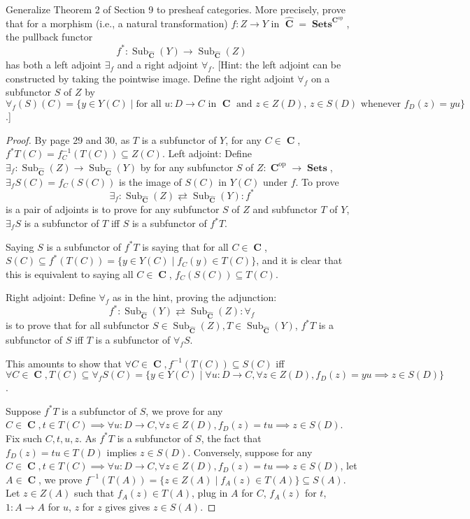 \documentclass[a4paper]{article}
\DeclareMathOperator{\Sets}{\mathbf {Sets}}
\DeclareMathOperator{\C}{\mathbf {C}}
\DeclareMathOperator{\op}{op}
\DeclareMathOperator{\Sub}{\text {Sub}}
\begin{document}
\begin{question}
    Generalize Theorem 2 of Section 9 to presheaf categories. More precisely, prove that for a morphism (i.e., a natural transformation) $f: Z\to Y$ in $\widehat{\C}=\Sets^{\C^{\op}}$, the pullback functor 
    \[f^*: \Sub_{\widehat{\C}}(Y)\to \Sub_{\widehat{\C}}(Z)\]
    has both a left adjoint $\exists_f$ and a right adjoint $\forall_f$. [Hint: the left adjoint can be constructed by taking the pointwise image. Define the right adjoint $\forall_f$ on a subfunctor $S$ of $Z$ by $\forall_f(S)(C)=\{y\in Y(C)\mid \text{for all $u: D\to C$ in $\C$ and $z\in Z(D)$, $z\in S(D)$ whenever $f_D(z)=yu$}\}$.]
    \begin{proof}
        By page 29 and 30, as $T$ is a subfunctor of $Y$, for any $C\in \C$, $f^*T(C)=f^{-1}_C(T(C))\subseteq Z(C)$.\newline
        Left adjoint: Define $\exists_f:\Sub_{\widehat{\C}}(Z)\to \Sub_{\widehat{\C}}(Y)$ by for any subfunctor $S$ of $Z:\C^{\op}\to \Sets$, $\exists_f S(C)= f_C(S(C))$ is the image of $S(C)$ in $Y(C)$ under $f$. To prove 
        \[\exists_f:\Sub_{\widehat{\C}}(Z)\rightleftarrows \Sub_{\widehat{\C}}(Y): f^*\]
        is a pair of adjoints is to prove for any subfunctor $S$ of $Z$ and subfunctor $T$ of $Y$, $\exists_f S$ is a subfunctor of $T$ iff $S$ is a subfunctor of $f^*T$. 

        Saying $S$ is a subfunctor of $f^*T$ is saying that for all $C\in \C$, $S(C)\subseteq f^*(T(C))= \{y\in Y(C)\mid f_C(y)\in T(C)\}$, and it is clear that this is equivalent to saying all $C\in \C$, $f_C(S(C))\subseteq T(C)$.\newline

        Right adjoint: Define $\forall_f$ as in the hint, proving the adjunction:
        \[f^*:\Sub_{\widehat{\C}}(Y)\rightleftarrows \Sub_{\widehat{\C}}(Z): \forall_f\]
        is to prove that for all subfunctor $S\in \Sub_{\widehat{\C}}(Z),T\in \Sub_{\widehat{\C}}(Y)$, $f^*T$ is a subfunctor of $S$ iff $T$ is a subfunctor of $\forall_fS$.
        
        
        This amounts to show that $\forall C\in \C,f^{-1}(T(C))\subseteq S(C)$ iff $\forall C\in \C, T(C)\subseteq \forall_fS(C)=\{y\in Y(C)\mid \forall u: D\to C, \forall z\in Z(D), f_D(z)=yu\implies z\in S(D)\}$. 

        Suppose $f^*T$ is a subfunctor of $S$, we prove for any $C\in \C, t\in T(C)\implies \forall u: D\to C,\forall z\in Z(D),f_D(z)=tu \implies z\in S(D)$. Fix such $C,t,u,z$. As $f^*T$ is a subfunctor of $S$, the fact that $f_D(z)=tu\in T(D)$ implies $z\in S(D)$. Conversely, suppose for any $C\in \C, t\in T(C)\implies \forall u: D\to C,\forall z\in Z(D),f_D(z)=tu \implies z\in S(D)$, let $A\in \C$, we prove $f^{-1}(T(A))=\{z\in Z(A)\mid f_A(z)\in T(A)\}\subseteq S(A)$. Let $z\in Z(A)$ such that $f_A(z)\in T(A)$, plug in $A$ for $C$, $f_A(z)$ for $t$, $1:A\to A$ for $u$, $z$ for $z$ gives gives $z\in S(A)$. 
    \end{proof}
\end{question}
\end{document}
